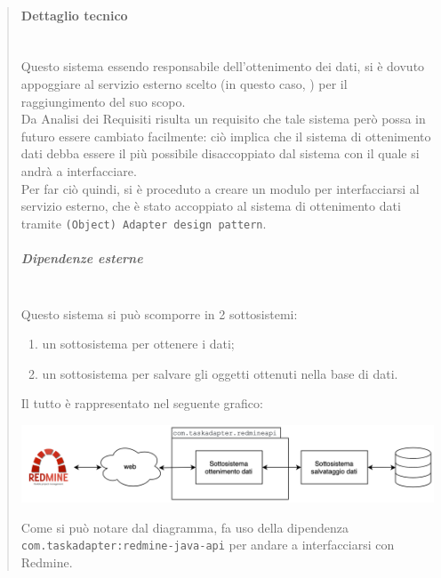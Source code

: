             \begin{quote}
            	\mbox{}%
            	\vspace{-1cm}
                \paragraph{Dettaglio tecnico}
	                \mbox{}\\
                    Questo sistema essendo responsabile dell'ottenimento dei dati, si è dovuto appoggiare al servizio esterno scelto (in questo caso, ) per il raggiungimento del suo scopo. \\
                    Da Analisi dei Requisiti risulta un requisito che tale sistema però possa in futuro essere cambiato facilmente: ciò implica che il sistema di ottenimento dati debba essere il più possibile disaccoppiato dal sistema con il quale si andrà a interfacciare. \\
                    Per far ciò quindi, si è proceduto a creare un modulo per interfacciarsi al servizio esterno, che è stato accoppiato al sistema di ottenimento dati tramite \texttt{(Object) Adapter design pattern}.
                    \subparagraph*{Dipendenze esterne}
                    \mbox{} \\
                        Questo sistema si può scomporre in 2 sottosistemi:
                        \begin{enumerate}
                            \item un sottosistema per ottenere i dati;
                            \item un sottosistema per salvare gli oggetti ottenuti nella base di dati.
                        \end{enumerate}
                        Il tutto è rappresentato nel seguente grafico:
                        \begin{center}
                            \includegraphics[keepaspectratio = true, width=14cm]{immagini/progettazione/ottenimento.png}
                        \end{center}
                        Come si può notare dal diagramma, fa uso della dipendenza \texttt{com.taskadapter:redmine-java-api} per andare a interfacciarsi con Redmine.
            \end{quote}
